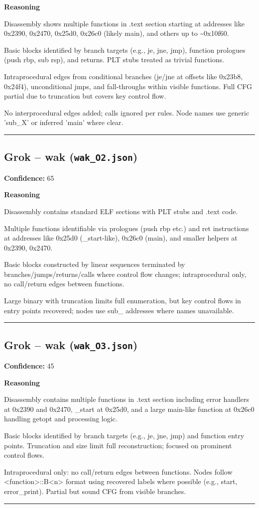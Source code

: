 \textbf{Reasoning}

Disassembly shows multiple functions in .text section starting at addresses like 0x2390, 0x2470, 0x25d0, 0x26c0 (likely main), and others up to \textasciitilde{}0x10f60.

Basic blocks identified by branch targets (e.g., je, jne, jmp), function prologues (push rbp, sub rsp), and returns. PLT stubs treated as trivial functions.

Intraprocedural edges from conditional branches (je/jne at offsets like 0x23b8, 0x24f4), unconditional jmps, and fall-throughs within visible functions. Full CFG partial due to truncation but covers key control flow.

No interprocedural edges added; calls ignored per rules. Node names use generic 'sub\_X' or inferred 'main' where clear.

\bigskip
\hrule
\bigskip

\subsection{Grok -- wak (\texttt{wak\_O2.json})}

\textbf{Confidence:} 65

\textbf{Reasoning}

Disassembly contains standard ELF sections with PLT stubs and .text code.

Multiple functions identifiable via prologues (push rbp etc.) and ret instructions at addresses like 0x25d0 (\_start-like), 0x26c0 (main), and smaller helpers at 0x2390, 0x2470.

Basic blocks constructed by linear sequences terminated by branches/jumps/returns/calls where control flow changes; intraprocedural only, no call/return edges between functions.

Large binary with truncation limits full enumeration, but key control flows in entry points recovered; nodes use sub\_ addresses where names unavailable.

\bigskip
\hrule
\bigskip

\subsection{Grok -- wak (\texttt{wak\_O3.json})}

\textbf{Confidence:} 45

\textbf{Reasoning}

Disassembly contains multiple functions in .text section including error handlers at 0x2390 and 0x2470, \_start at 0x25d0, and a large main-like function at 0x26c0 handling getopt and processing logic.

Basic blocks identified by branch targets (e.g., je, jne, jmp) and function entry points. Truncation and size limit full reconstruction; focused on prominent control flows.

Intraprocedural only: no call/return edges between functions. Nodes follow <function>::B<n> format using recovered labels where possible (e.g., start, error\_print). Partial but sound CFG from visible branches.

\bigskip
\hrule
\bigskip

